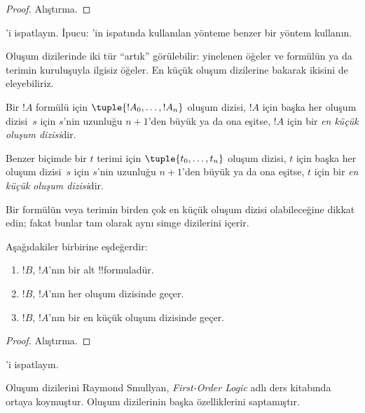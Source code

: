 \documentclass[../../../include/open-logic-section]{subfiles}
\begin{document}
\begin{proof}
Alıştırma.
\end{proof}

\begin{prob}
'i ispatlayın.
İpucu: 'in ispatında kullanılan
yönteme benzer bir yöntem kullanın.
\end{prob}

Oluşum dizilerinde iki tür ``artık'' görülebilir: yinelenen öğeler ve
formülün ya da terimin kuruluşuyla ilgisiz öğeler. En küçük oluşum
dizilerine bakarak ikisini de eleyebiliriz.

\begin{defn}
Bir $!A$ formülü için $\tuple{!A_0, \ldots, !A_n}$ oluşum dizisi,
$!A$ için başka her oluşum dizisi~$s$ için $s$'nin uzunluğu $n+1$'den büyük ya da
ona eşitse, $!A$ için bir \emph{en küçük oluşum dizisi}dir.

Benzer biçimde bir $t$ terimi için $\tuple{t_0, \ldots, t_n}$ oluşum
dizisi, $t$ için başka her oluşum dizisi~$s$ için $s$'nin uzunluğu $n+1$'den büyük
ya da ona eşitse, $t$ için bir \emph{en küçük oluşum dizisi}dir.
\end{defn}

Bir formülün veya terimin birden çok en küçük oluşum dizisi olabileceğine
dikkat edin; fakat bunlar tam olarak aynı simge dizilerini içerir.

\begin{prop}
Aşağıdakiler birbirine eşdeğerdir:
\begin{enumerate}
    \item $!B$, $!A$'nın bir alt !!{formula}{}dür.
    \item $!B$, $!A$'nın her oluşum dizisinde geçer.
    \item $!B$, $!A$'nın bir en küçük oluşum dizisinde geçer.
\end{enumerate}
\end{prop}

\begin{proof}
Alıştırma.
\end{proof}

\begin{prob}
'i ispatlayın.
\end{prob}

\begin{history}
Oluşum dizilerini Raymond Smullyan, \emph{First-Order Logic}
\citep{Smullyan1968} adlı ders kitabında ortaya koymuştur. Oluşum
dizilerinin başka özelliklerini \citet{Zuckerman1973} saptamıştır.
\end{history}
\end{document}
